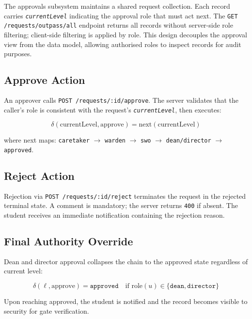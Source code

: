 \documentclass[12pt,a4paper]{report}
\newcommand{\api}[1]{\texttt{\small #1}}
\newcommand{\field}[1]{\texttt{\textit{#1}}}
\newcommand{\code}[1]{\texttt{#1}}
\begin{document}
The approvals subsystem maintains a shared request collection. Each record carries \field{currentLevel} indicating the approval role that must act next. The \api{GET /requests/outpass/all} endpoint returns all records without server-side role filtering; client-side filtering is applied by role. This design decouples the approval view from the data model, allowing authorised roles to inspect records for audit purposes.

\subsection{Approve Action}

An approver calls \api{POST /requests/:id/approve}. The server validates that the caller's role is consistent with the request's \field{currentLevel}, then executes:

\begin{equation}
  \delta(\text{currentLevel}, \text{approve}) = \text{next}(\text{currentLevel})
  \label{eq:approve}
\end{equation}

where next maps: \code{caretaker} $\to$ \code{warden} $\to$ \code{swo} $\to$ \code{dean/director} $\to$ \code{approved}.

\subsection{Reject Action}

Rejection via \api{POST /requests/:id/reject} terminates the request in the rejected terminal state. A comment is mandatory; the server returns \code{400} if absent. The student receives an immediate notification containing the rejection reason.

\subsection{Final Authority Override}

Dean and director approval collapses the chain to the approved state regardless of current level:

\begin{equation}
  \delta(\ell, \text{approve}) = \texttt{approved} \quad \text{if } \text{role}(u) \in \{\texttt{dean}, \texttt{director}\}
  \label{eq:override}
\end{equation}

Upon reaching approved, the student is notified and the record becomes visible to security for gate verification.
\end{document}
